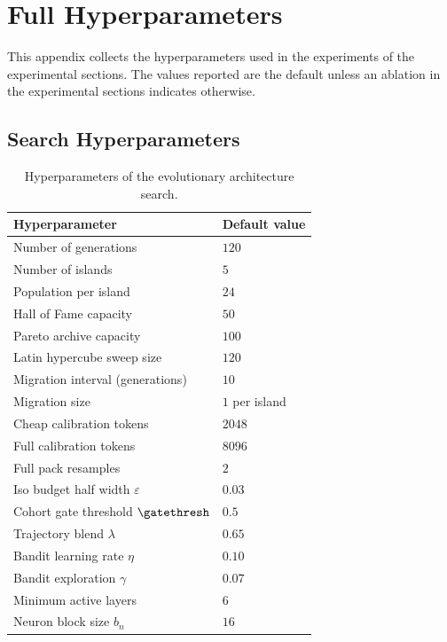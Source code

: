 \section{Full Hyperparameters}
\label{app:hyper}

This appendix collects the hyperparameters used in the experiments of the experimental sections. The values reported are the default unless an ablation in the experimental sections indicates otherwise.

\subsection{Search Hyperparameters}

\begin{table}[h]
\centering
\caption{Hyperparameters of the evolutionary architecture search.}
\begin{tabular}{ll}
\toprule
Hyperparameter & Default value \\
\midrule
Number of generations                          & $120$ \\
Number of islands                              & $5$ \\
Population per island                          & $24$ \\
Hall of Fame capacity                          & $50$ \\
Pareto archive capacity                        & $100$ \\
Latin hypercube sweep size                     & $120$ \\
Migration interval (generations)               & $10$ \\
Migration size                                 & $1$ per island \\
Cheap calibration tokens                       & $2048$ \\
Full calibration tokens                        & $8096$ \\
Full pack resamples                            & $2$ \\
Iso budget half width $\varepsilon$            & $0.03$ \\
Cohort gate threshold $\gatethresh$            & $0.5$ \\
Trajectory blend $\lambda$                     & $0.65$ \\
Bandit learning rate $\eta$                    & $0.10$ \\
Bandit exploration $\gamma$                    & $0.07$ \\
Minimum active layers                          & $6$ \\
Neuron block size $b_n$                        & $16$ \\
\bottomrule
\end{tabular}
\end{table}


